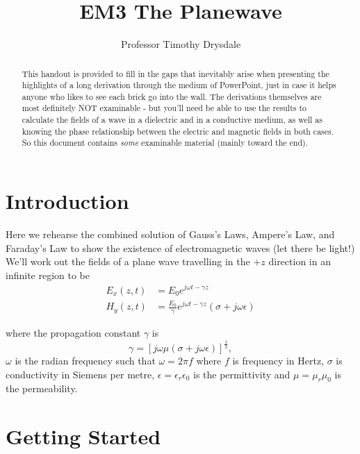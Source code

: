 \documentclass{tufte-handout}
\title{EM3 The Planewave}
\author{Professor Timothy Drysdale}
\begin{document}
\maketitle

\begin{abstract}
\noindent
This handout is provided to fill in the gaps that inevitably arise when presenting the highlights of a long derivation through the medium of PowerPoint, just in case it helps anyone who likes to see each brick go into the wall. The derivations themselves are most definitely NOT examinable - but you'll need be able to use the results to calculate the fields of a wave in a dielectric and in a conductive medium, as well as knowing the phase relationship between the electric and magnetic fields in both cases. So this document contains \emph{some} examinable material (mainly toward the end).
\begin{marginfigure}

\end{marginfigure}
\end{abstract}

\section{Introduction}
Here we rehearse the combined solution of Gauss's Laws, Ampere's Law, and Faraday's Law to show the existence of electromagnetic waves (let there be light!) We'll work out the fields of a plane wave travelling in the $+z$ direction in an infinite region to be
\begin{align*}
E_x(z,t) &= E_0e^{j\omega{}t - \gamma{}z}\\
H_y(z,t) &= \frac{E_0}{\gamma}e^{j\omega{}t - \gamma{}z}\left(\sigma + j\omega\epsilon\right)
\end{align*}
\begin{marginfigure}

\end{marginfigure}
where the propagation constant $\gamma$ is 
\[ \gamma = \left[j\omega\mu\left(\sigma+j\omega\epsilon \right)\right]^{\frac{1}{2}},\]
$\omega$ is the radian frequency such that $\omega=2\pi{}f$ where $f$ is frequency in Hertz, $\sigma$ is conductivity in Siemens per metre, $\epsilon = \epsilon_r\epsilon_0$ is the permittivity and $\mu=\mu_r\mu_0$ is the permeability. 

\section{Getting Started}
\end{document}
